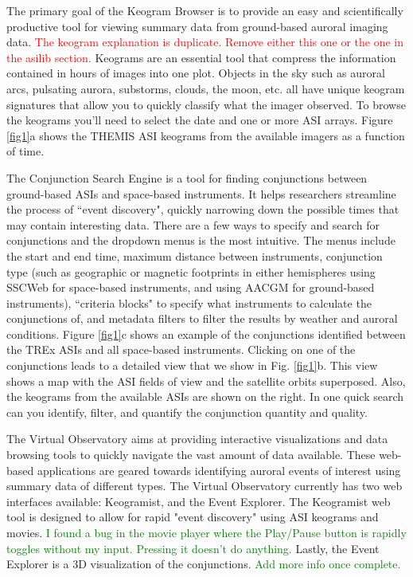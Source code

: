 \documentclass[draft]{agujournal2019}
\begin{document}
The primary goal of the Keogram Browser is to provide an easy and scientifically productive tool for viewing summary data from ground-based auroral imaging data. \textcolor{red}{The keogram explanation is duplicate. Remove either this one or the one in the asilib section.} Keograms are an essential tool that compress the information contained in hours of images into one plot. Objects in the sky such as auroral arcs, pulsating aurora, substorms, clouds, the moon, etc. all have unique keogram signatures that allow you to quickly classify what the imager observed. To browse the keograms you'll need to select the date and one or more ASI arrays. Figure \ref{fig1}a shows the THEMIS ASI keograms from the available imagers as a function of time.

The Conjunction Search Engine is a tool for finding conjunctions between ground-based ASIs and space-based instruments. It helps researchers streamline the process of ``event discovery", quickly narrowing down the possible times that may contain interesting data. There are a few ways to specify and search for conjunctions and the dropdown menus is the most intuitive. The menus include the start and end time, maximum distance between instruments, conjunction type (such as geographic or magnetic footprints in either hemispheres using SSCWeb for space-based instruments, and using AACGM for ground-based instruments), ``criteria blocks" to specify what instruments to calculate the conjunctions of, and metadata filters to filter the results by weather and auroral conditions. Figure \ref{fig1}c shows an example of the conjunctions identified between the TREx ASIs and all space-based instruments. Clicking on one of the conjunctions leads to a detailed view that we show in Fig. \ref{fig1}b. This view shows a map with the ASI fields of view and the satellite orbits superposed. Also, the keograms from the available ASIs are shown on the right. In one quick search can you identify, filter, and quantify the conjunction quantity and quality.

The Virtual Observatory aims at providing interactive visualizations and data browsing tools to quickly navigate the vast amount of data available. These web-based applications are geared towards identifying auroral events of interest using summary data of different types. The Virtual Observatory currently has two web interfaces available: Keogramist, and the Event Explorer. The Keogramist web tool is designed to allow for rapid "event discovery" using ASI keograms and movies. \textcolor{green}{I found a bug in the movie player where the Play/Pause button is rapidly toggles without my input. Pressing it doesn't do anything.} Lastly, the Event Explorer is a 3D visualization of the conjunctions. \textcolor{green}{Add more info once complete.}
\end{document}
